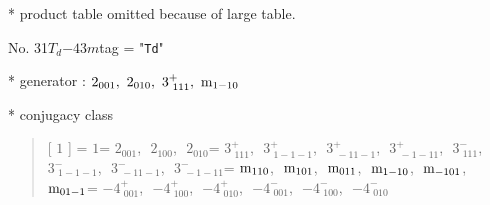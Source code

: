 \documentclass[fleqn,10pt,landscape]{jsarticle}
\begin{document}
* product table
\quad\quad omitted because of large table.

\newpage

No. 31\quad$T_{d}$\quad$-43m$\quad[ cubic ]
tag = "{\tt Td}"

* generator : $2{}_{001},\,\,2{}_{010},\,\,3^{+}_{\,\,111},\,\,{\rm m}_{1-10}$

* conjugacy class
\begin{quote}
[ $1$ ] = \quad $1$\newline[ $2{}_{001}$ ] = \quad $2{}_{001}$,\,\, $2{}_{100}$,\,\, $2{}_{010}$\newline[ $3^{+}_{\,\,111}$ ] = \quad $3^{+}_{\,\,111}$,\,\, $3^{+}_{\,\,1-1-1}$,\,\, $3^{+}_{\,\,-11-1}$,\,\, $3^{+}_{\,\,-1-11}$,\,\, $3^{-}_{\,\,111}$,\,\, $3^{-}_{\,\,1-1-1}$,\,\, $3^{-}_{\,\,-11-1}$,\,\, $3^{-}_{\,\,-1-11}$\newline[ ${\rm m}_{110}$ ] = \quad ${\rm m}_{110}$,\,\, ${\rm m}_{101}$,\,\, ${\rm m}_{011}$,\,\, ${\rm m}_{1-10}$,\,\, ${\rm m}_{-101}$,\,\, ${\rm m}_{01-1}$\newline[ $-4^{+}_{\,\,001}$ ] = \quad $-4^{+}_{\,\,001}$,\,\, $-4^{+}_{\,\,100}$,\,\, $-4^{+}_{\,\,010}$,\,\, $-4^{-}_{\,\,001}$,\,\, $-4^{-}_{\,\,100}$,\,\, $-4^{-}_{\,\,010}$\newline
\end{quote}
\end{document}
